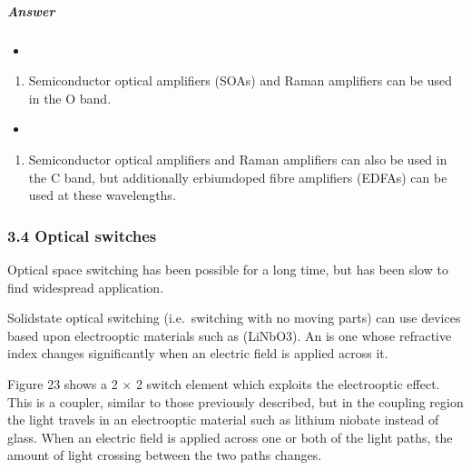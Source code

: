 \documentclass[letterpaper,10pt,english]{sphinxmanual}
\let\sphinxpxdimen\pdfpxdimen\else\newdimen\sphinxpxdimen
\begin{document}
\subparagraph{Answer}
\label{\detokenize{content/session_00/Part_00_03:id6}}\begin{itemize}
\item {} 
\end{itemize}
\begin{enumerate}
%
\item {} 
Semiconductor optical amplifiers (SOAs) and Raman amplifiers can be used in the O band.

\end{enumerate}
\begin{itemize}
\item {} 
\end{itemize}
\begin{enumerate}
%
\setcounter{enumi}{1}
\item {} 
Semiconductor optical amplifiers and Raman amplifiers can also be used in the C band, but additionally erbium\sphinxhyphen{}doped fibre amplifiers (EDFAs) can be used at these wavelengths.

\end{enumerate}




\subsubsection{3.4 Optical switches}
\label{\detokenize{content/session_00/Part_00_03:3.4-Optical-switches}}
Optical space switching has been possible for a long time, but has been slow to find widespread application.

Solid\sphinxhyphen{}state optical switching (i.e. switching with no moving parts) can use devices based upon electro\sphinxhyphen{}optic materials such as  (LiNbO3). An  is one whose refractive index changes significantly when an electric field is applied across it.

Figure 23 shows a 2 × 2 switch element which exploits the electro\sphinxhyphen{}optic effect. This is a coupler, similar to those previously described, but in the coupling region the light travels in an electro\sphinxhyphen{}optic material such as lithium niobate instead of glass. When an electric field is applied across one or both of the light paths, the amount of light crossing between the two paths changes.

\sphinxincludegraphics[width=511\sphinxpxdimen,height=221\sphinxpxdimen]{{t305_022i}.jpg}
\end{document}
